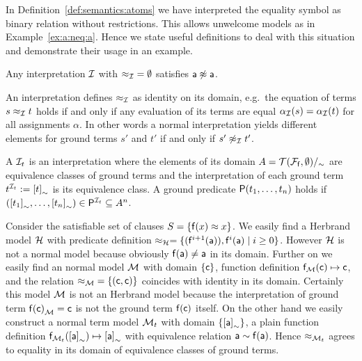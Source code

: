 In Definition~\ref{def:semantics:atoms} we have interpreted the equality symbol as binary relation without restrictions.
This allows unwelcome models as in Example~\ref{ex:a:neq:a}.
Hence we state useful definitions to deal with this situation and demonstrate their usage in an example.

\begin{example}\label{ex:a:neq:a}
	Any interpretation \( \mathcal{I} \)
	with \( {\approx_{\mathcal{I}}} = \emptyset \) satisfies \( \mathsf{a}\not\approx\mathsf{a} \).
\end{example}

\begin{definition}\label{def:normal:interpreation}
	An  interpretation defines \( \approx_{\mathcal{I}} \) as identity on its domain,
	e.g.~the equation of terms \( s \approx_{\mathcal{I}} t \) holds if and only
	if any evaluation of its terms are equal \( \alpha_{\mathcal{I}}(s) = \alpha_{\mathcal{I}}(t) \)
	for all assignments \( \alpha \).
	In other words a normal interpretation yields different elements
	for ground terms \( s' \) and \( t' \) if and only if \( s'\not\approx_{\mathcal{I}} t' \).
\end{definition}

\begin{definition}
	A 
	\( \mathcal{I}_t \)
	is an interpretation
	where the elements of its domain \( A = {\mathcal{T}(\mathcal{F}_{\mathsf{f}},\emptyset)}/_\sim \)
	are equivalence classes of ground terms
	and the interpretation of each ground term \( t^{\mathcal{I}_t} := {[t]}_\sim \) is its equivalence class.
	A ground predicate \( \mathsf{P}(t_1,\ldots,t_n) \) holds if
	\( ({[t_1]}_\sim,\ldots,{[t_n]}_\sim) \in \mathsf{P}^{\mathcal{I}_t} \subseteq A^n \).
\end{definition}


\begin{example}
	Consider the satisfiable set of clauses \( S = \{ \mathsf{f}(x) \approx x \} \).
	We easily find a Herbrand model \( \mathcal{H} \) with
	predicate definition
	\( \approx_{\mathcal{H}} = \{ (\mathsf{f}^{i+1}(\mathsf{a})), \mathsf{f}^{i}(\mathsf{a}) \mid i\geq 0  \}  \).
	However \( \mathcal{H} \) is not a normal model because obviously \( \mathsf{f}(\mathsf{a})\neq\mathsf{a} \) in its domain.
	Further on we easily find an normal model \( \mathcal{M} \)
	with domain \( \{ \mathsf{c} \} \), function definition \( \mathsf{f}_{\mathcal{M}}(\mathsf{c}) \mapsto \mathsf{c} \),
	and the relation \( {\approx_{\mathcal{M}}} = \{ (\mathsf{c},\mathsf{c})\} \) coincides with identity in its domain.
	Certainly this model \( \mathcal{M} \) is not an Herbrand model
	because the interpretation of ground term \( {\mathsf{f}(\mathsf{c})}_{\mathcal{M}} = \mathsf{c} \) is not the ground term \( \mathsf{f}(\mathsf{c}) \) itself.
	On the other hand we easily construct a normal term model
	\( \mathcal{M}_t \) with domain \( \{ {[\mathsf{a}]}_\sim \} \),
	a plain function definition
	\( \mathsf{f}_{\mathcal{M}_t}({[\mathsf{a}]}_\sim) \mapsto {[\mathsf{a}]}_\sim \)
	with equivalence relation
	\( \mathsf{a} \sim \mathsf{f}(\mathsf{a}) \).
	Hence \( \approx_{\mathcal{M}_t} \) agrees to equality in its domain of equivalence classes of ground terms.
\end{example}

